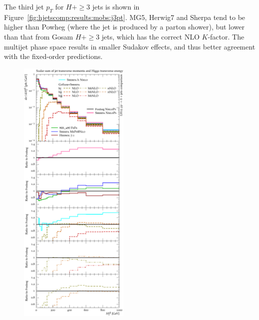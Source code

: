 The third jet $p_T$ for $H+\ge3$ jets is shown in
Figure~\ref{fig:hjetscomp:results:mobs:j3pt}. MG5, Herwig7 and Sherpa
tend to be higher than Powheg (where the jet is produced by a parton
shower), but lower than that from Gosam $H+\ge3$ jets, which has the
correct NLO $K$-factor. The multijet phase space results in smaller
Sudakov effects, and thus better agreement with the fixed-order
predictions.

\begin{figure}[t!]
  \centering
  \includegraphics[width=0.47\textwidth]{figures/hjetscomp_u_HT_all.pdf}
  \hfill

\end{figure}
